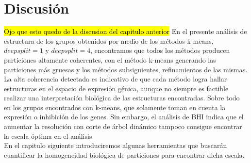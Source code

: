 \section{Discusión}
\hl{Ojo que esto quedo de la discusion del capitulo anterior}
En el presente análisis de estructura de los grupos obtenidos por medio de los métodos k-means, $deepsplit=1$ y $deepsplit=4$, encontramos que todos los métodos producen particiones altamente coherentes, con el método k-means generando las particiones más gruesas y los métodos subsiguientes, refinamientos de las mismas. La alta coherencia detectada es indicativo de que cada método logra  hallar estructuras en el espacio de expresión génica, aunque no siempre es factible realizar una interpretación biológica de las estructuras encontradas. Sobre todo en los grupos encontrados con k-means, que solamente toman en cuenta la expresión o inhibición de los genes. Sin embargo, el análisis de BHI indica que el aumentar la resolución con corte de árbol dinámico tampoco consigue encontrar la escala óptima en el análisis.\\
En el capitulo siguiente introduciremos algunas herramientas que buscarán cuantificar la homogeneidad biológica de particiones para encontrar dicha escala.